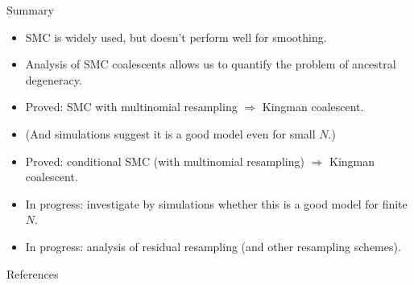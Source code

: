 \documentclass[aspectratio=169]{beamer}
\theoremstyle{definition}
\begin{document}
\begin{frame}{Summary}
\begin{itemize}
\item SMC is widely used, but doesn't perform well for smoothing.

\item Analysis of SMC coalescents allows us to quantify the problem of ancestral degeneracy.

\item Proved: SMC with multinomial resampling $\Rightarrow$ Kingman coalescent.
\item (And simulations suggest it is a good model even for small $N$.)

\item Proved: conditional SMC (with multinomial resampling) $\Rightarrow$ Kingman coalescent.
\item In progress: investigate by simulations whether this is a good model for finite $N$.

\item In progress: analysis of residual resampling (and other resampling schemes).
\end{itemize}
\end{frame}

\begin{frame}[allowframebreaks]{References}

{\small 

}
\end{frame}
\end{document}
